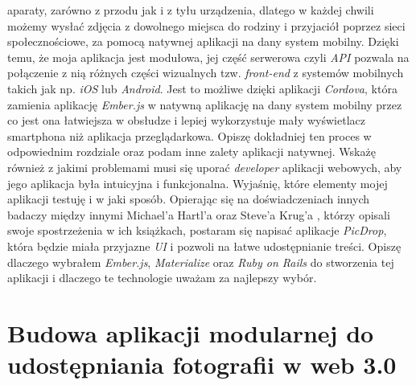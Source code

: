 \documentclass[openright]{xmgr}
\begin{document}
aparaty, zarówno z przodu jak i z tyłu urządzenia, dlatego w każdej chwili możemy wysłać zdjęcia z dowolnego miejsca do rodziny i przyjaciół poprzez sieci społecznościowe, za pomocą natywnej aplikacji na dany system mobilny. Dzięki temu, że moja aplikacja jest modułowa, jej część serwerowa czyli \textit{API} pozwala na połączenie z nią różnych części wizualnych tzw. \textit{front-end} z systemów mobilnych takich jak np. \textit{iOS} lub \textit{Android}. Jest to możliwe dzięki aplikacji \textit{Cordova}, która zamienia aplikację \textit{Ember.js} w natywną aplikację na dany system mobilny przez co jest ona łatwiejsza w obsłudze i lepiej wykorzystuje mały wyświetlacz smartphona niż aplikacja przeglądarkowa. Opiszę dokładniej ten proces w odpowiednim rozdziale oraz podam inne zalety aplikacji natywnej. Wskażę również z jakimi problemami musi się uporać \textit{developer} aplikacji webowych, aby jego aplikacja była intuicyjna i funkcjonalna. Wyjaśnię, które elementy mojej aplikacji testuję i w jaki sposób. Opierając się na  doświadczeniach innych badaczy  między innymi Michael'a Hartl'a \cite{RailsTutorialBook} oraz Steve'a Krug'a  \cite {StiveKrug}, którzy opisali swoje spostrzeżenia w ich książkach, postaram się napisać aplikacje \textit{PicDrop}, która  będzie miała przyjazne \textit{UI} i pozwoli na łatwe udostępnianie treści. Opiszę dlaczego wybrałem \textit{Ember.js}, \textit{Materialize} oraz \textit{Ruby on Rails} do stworzenia tej aplikacji i dlaczego te technologie uważam za najlepszy wybór.


\chapter{Budowa aplikacji modularnej do udostępniania fotografii  w web 3.0}
\end{document}
